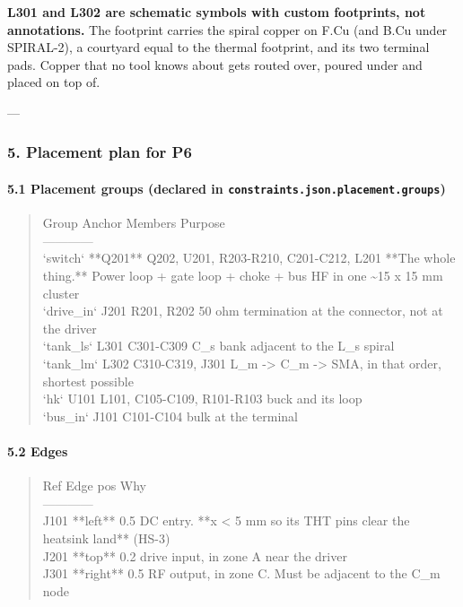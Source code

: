 \documentclass[11pt,a4paper]{article}
\begin{document}
\textbf{L301 and L302 are schematic symbols with custom footprints, not annotations.} The footprint carries the spiral copper on F.Cu (and B.Cu under SPIRAL-2), a courtyard equal to the thermal footprint, and its two terminal pads. Copper that no tool knows about gets routed over, poured under and placed on top of.

---

\subsubsection*{5. Placement plan for P6}
\paragraph*{5.1 Placement groups (declared in \texttt{constraints.json.placement.groups})}
\begin{quote}\small\ttfamily\raggedright
\textbar{} Group \textbar{} Anchor \textbar{} Members \textbar{} Purpose \textbar{}\\
\textbar{}---\textbar{}---\textbar{}---\textbar{}---\textbar{}\\
\textbar{} `switch` \textbar{} {*}{*}Q201{*}{*} \textbar{} Q202, U201, R203-R210, C201-C212, L201 \textbar{} {*}{*}The whole thing.{*}{*} Power loop + gate loop + choke + bus HF in one \textasciitilde{}15 x 15 mm cluster \textbar{}\\
\textbar{} `drive\_in` \textbar{} J201 \textbar{} R201, R202 \textbar{} 50 ohm termination at the connector, not at the driver \textbar{}\\
\textbar{} `tank\_ls` \textbar{} L301 \textbar{} C301-C309 \textbar{} C\_s bank adjacent to the L\_s spiral \textbar{}\\
\textbar{} `tank\_lm` \textbar{} L302 \textbar{} C310-C319, J301 \textbar{} L\_m -\textgreater{} C\_m -\textgreater{} SMA, in that order, shortest possible \textbar{}\\
\textbar{} `hk` \textbar{} U101 \textbar{} L101, C105-C109, R101-R103 \textbar{} buck and its loop \textbar{}\\
\textbar{} `bus\_in` \textbar{} J101 \textbar{} C101-C104 \textbar{} bulk at the terminal \textbar{}
\end{quote}
\paragraph*{5.2 Edges}
\begin{quote}\small\ttfamily\raggedright
\textbar{} Ref \textbar{} Edge \textbar{} pos \textbar{} Why \textbar{}\\
\textbar{}---\textbar{}---\textbar{}---\textbar{}---\textbar{}\\
\textbar{} J101 \textbar{} {*}{*}left{*}{*} \textbar{} 0.5 \textbar{} DC entry. {*}{*}x \textless{} 5 mm so its THT pins clear the heatsink land{*}{*} (HS-3) \textbar{}\\
\textbar{} J201 \textbar{} {*}{*}top{*}{*} \textbar{} 0.2 \textbar{} drive input, in zone A near the driver \textbar{}\\
\textbar{} J301 \textbar{} {*}{*}right{*}{*} \textbar{} 0.5 \textbar{} RF output, in zone C. Must be adjacent to the C\_m node \textbar{}
\end{quote}
\end{document}
